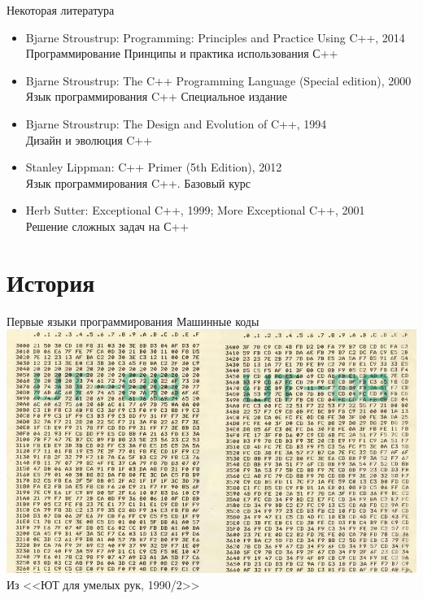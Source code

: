 \documentclass{beamer}
\begin{document}
\begin{frame}{Некоторая литература}
\begin{itemize}
  \item Bjarne Stroustrup: Programming: Principles and Practice Using C++, 2014\\Программирование Принципы и практика использования С++
  \item Bjarne Stroustrup: The C++ Programming Language (Special edition), 2000\\Язык программирования C++ Специальное издание
  \item Bjarne Stroustrup: The Design and Evolution of C++, 1994\\Дизайн и эволюция C++
  \item Stanley Lippman: C++ Primer (5th Edition), 2012\\Язык программирования C++. Базовый курс
  \item Herb Sutter: Exceptional C++, 1999; More Exceptional C++, 2001\\Решение сложных задач на С++
\end{itemize}
\end{frame}

\section{История}

\begin{frame}{Первые языки программирования}
Машинные коды\\
\includegraphics[keepaspectratio]{history/ut88.png}\\
{\tiny Из <<ЮТ для умелых рук, 1990/2>>}
\end{frame}
\end{document}
